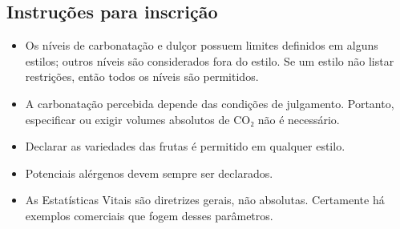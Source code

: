 \subsection*{Instruções para inscrição}

\begin{itemize}
\item Os níveis de carbonatação e dulçor possuem limites definidos em alguns estilos; outros níveis são considerados fora do estilo. Se um estilo não listar restrições, então todos os níveis são permitidos.
\item A carbonatação percebida depende das condições de julgamento. Portanto, especificar ou exigir volumes absolutos de CO₂ não é necessário.
\item Declarar as variedades das frutas é permitido em qualquer estilo.
\item Potenciais alérgenos devem sempre ser declarados.
\item As Estatísticas Vitais são diretrizes gerais, não absolutas. Certamente há exemplos comerciais que fogem desses parâmetros.
\end{itemize}
